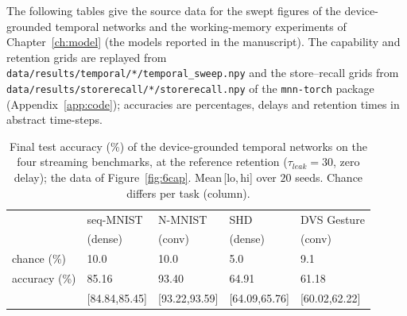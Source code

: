 \noindent The following tables give the source data for the swept figures of the
device-grounded temporal networks and the working-memory experiments of
Chapter~\ref{ch:model} (the models reported in the  manuscript). The
capability and retention grids are replayed from
\texttt{data/results/temporal/*/temporal\_sweep.npy} and the store--recall grids from
\texttt{data/results/storerecall/*/storerecall.npy} of the \texttt{mnn-torch} package
(Appendix~\ref{app:code}); accuracies are percentages, delays and retention times in
abstract time-steps.

\begin{table}[H]
    \caption[Source data: benchmark capability (Fig.~\ref{fig:6cap}).]{Final test
    accuracy (\%) of the device-grounded temporal networks on the four streaming
    benchmarks, at the reference retention ($\tau_{leak}{=}30$, zero delay); the data of
    Figure~\ref{fig:6cap}. Mean\,[lo,\,hi] over $20$ seeds. Chance differs per task
    (column).}
    \begin{center}
    \footnotesize
    \begin{tabularx}{\textwidth}{@{}l *{4}{Y}@{}}
    \toprule
     & seq-MNIST & N-MNIST & SHD & DVS Gesture \\
     & (dense) & (conv) & (dense) & (conv) \\
    \midrule
    chance (\%)       & 10.0 & 10.0 & 5.0 & 9.1 \\
    accuracy (\%)     & 85.16 & 93.40 & 64.91 & 61.18 \\
    \;[lo,\,hi] & \tiny[84.84,85.45] & \tiny[93.22,93.59] & \tiny[64.09,65.76] & \tiny[60.02,62.22] \\
    \bottomrule
    \end{tabularx}
    \label{table:E11}
    \end{center}
    \vspace*{-\baselineskip}
\end{table}

